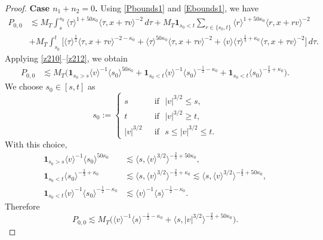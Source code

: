 \documentclass[reqno,11pt]{amsart}
\numberwithin{equation}{section}
\begin{document}
\begin{proof}
	
	{\bf{Case $n_1+n_2=0$.}} Using \eqref{Pbounds1} and \eqref{Ebounds1}, we have
	\begin{align*}
		P_{0,0}&\lesssim
		M_T\int_s^{s_0}\langle \tau\rangle^{1+50\kappa_0}
		\langle \tau,x+\tau v\rangle^{-2}\,d\tau+M_T\mathbf 1_{s_0<t}\sum_{r\in\{s_0,t\}}
		\langle r\rangle^{1+50\kappa_0}
		\langle r,x+rv\rangle^{-2}\\
		&+M_T\int_{s_0}^{t}\Big[
		\langle \tau\rangle^{\frac12}
		\langle \tau,x+\tau v\rangle^{-2-\kappa_0}+
		\langle \tau\rangle^{50\kappa_0}
		\langle \tau,x+\tau v\rangle^{-2}+
		\langle v\rangle
		\langle \tau\rangle^{\frac13+\kappa_0}
		\langle \tau,x+\tau v\rangle^{-2}
		\Big]\,d\tau .
	\end{align*}
	Applying \eqref{z210}--\eqref{z212}, we obtain
	\begin{align}
		P_{0,0}&\lesssim M_T\big(\mathbf 1_{s_0>s}\langle v\rangle^{-1}
		\langle s_0\rangle^{50\kappa_0}+\mathbf 1_{s_0<t}
		\langle v\rangle^{-1}
		\langle s_0\rangle^{-\frac12-\kappa_0}+\mathbf 1_{s_0<t}
		\langle s_0\rangle^{-\frac23+\kappa_0}\big).
		\label{P00-pre}
	\end{align}
	We choose $s_0\in[s,t]$ as 
	\begin{equation}\label{choice-s0-P00}
		s_0:=\begin{cases}
			s\qquad&\text{ if }\,\,|v|^{3/2}\leq s,\\
			t\qquad&\text{ if }\,\,|v|^{3/2}\geq t,\\
			|v|^{3/2}&\text{ if }\,\,s\leq |v|^{3/2}\leq t.
		\end{cases}		
	\end{equation}
	With this choice,
	\begin{align*}
		\mathbf 1_{s_0>s}
		\langle v\rangle^{-1}
		\langle s_0\rangle^{50\kappa_0}
		&\lesssim
		\langle s,\langle v\rangle^{3/2}\rangle^{-\frac23+50\kappa_0},\\
		\mathbf 1_{s_0<t}\langle s_0\rangle^{-\frac23+\kappa_0}
		&\lesssim
		\langle s,\langle v\rangle^{3/2}\rangle^{-\frac23+\kappa_0}\lesssim
		\langle s,\langle v\rangle^{3/2}\rangle^{-\frac23+50\kappa_0},\\
		\mathbf 1_{s_0<t}
		\langle v\rangle^{-1}
		\langle s_0\rangle^{-\frac12-\kappa_0}
		&\lesssim
		\langle v\rangle^{-1}
		\langle s\rangle^{-\frac12-\kappa_0}.
	\end{align*}
	Therefore
	\begin{equation}\label{q60}
		P_{0,0}\lesssim M_T\big(\langle v\rangle^{-1}\langle s\rangle^{-\frac12-\kappa_0}+
		\langle s,|v|^{3/2}\rangle^{-\frac23+50\kappa_0}\big).
	\end{equation}
	

\end{proof}
\end{document}
